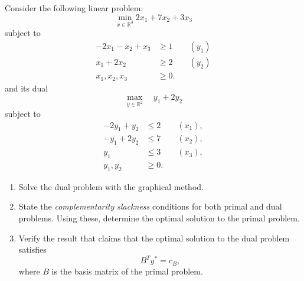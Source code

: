 
Consider the following linear problem:
\[
\min_{x \in \mathbb{R}^3} 2x_1+7x_2+3x_3
\]
subject to
\begin{align*}
-2x_1-x_2+x_3 &\geq 1 \qquad  (y_1)\\
x_1+2x_2 &\geq 2 \qquad  (y_2)\\
 x_1,x_2,x_3 &\geq 0 .
\end{align*}
and its dual
\[
\max_{y \in \mathbb{R}^2} \quad y_1 + 2y_2
\]
subject to
\begin{align*}
-2y_1+y_2 &\leq 2 \qquad  (x_1),\\
-y_1+2y_2 &\leq 7  \qquad  (x_2),\\
y_1 &\leq 3  \qquad  (x_3),\\
y_1,y_2&\geq 0.
\end{align*}	


\begin{enumerate}
\item  Solve the dual problem with the graphical method.
\item State the \textit{complementarity slackness} conditions for both primal and dual problems. Using these, determine the optimal solution to the primal problem. 
\item Verify the result that  claims that the optimal solution to the dual problem satisfies
\[
B^Ty^* = c_B,
\]
where $B$ is the basis matrix of the primal problem.
\end{enumerate}


